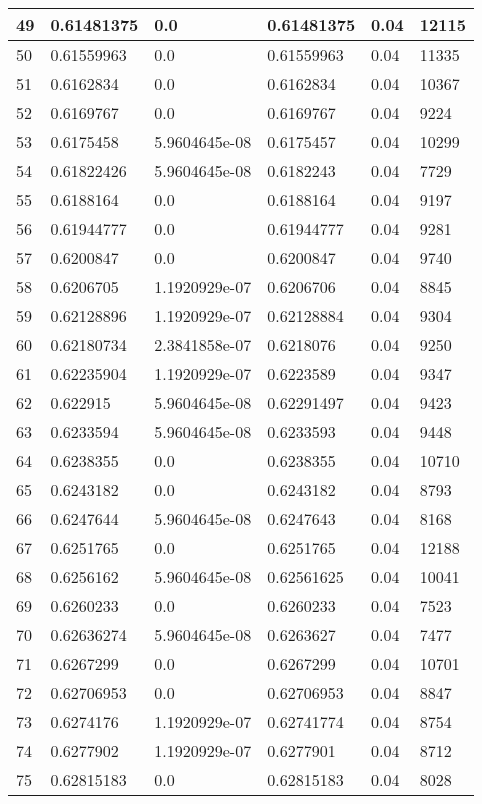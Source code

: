 \begin{longtable}{|l|l|l|l|l|l|}
49 & 0.61481375 & 0.0 & 0.61481375 & 0.04 & 12115 \\ \hline 
50 & 0.61559963 & 0.0 & 0.61559963 & 0.04 & 11335 \\ \hline 
51 & 0.6162834 & 0.0 & 0.6162834 & 0.04 & 10367 \\ \hline 
52 & 0.6169767 & 0.0 & 0.6169767 & 0.04 & 9224 \\ \hline 
53 & 0.6175458 & 5.9604645e-08 & 0.6175457 & 0.04 & 10299 \\ \hline 
54 & 0.61822426 & 5.9604645e-08 & 0.6182243 & 0.04 & 7729 \\ \hline 
55 & 0.6188164 & 0.0 & 0.6188164 & 0.04 & 9197 \\ \hline 
56 & 0.61944777 & 0.0 & 0.61944777 & 0.04 & 9281 \\ \hline 
57 & 0.6200847 & 0.0 & 0.6200847 & 0.04 & 9740 \\ \hline 
58 & 0.6206705 & 1.1920929e-07 & 0.6206706 & 0.04 & 8845 \\ \hline 
59 & 0.62128896 & 1.1920929e-07 & 0.62128884 & 0.04 & 9304 \\ \hline 
60 & 0.62180734 & 2.3841858e-07 & 0.6218076 & 0.04 & 9250 \\ \hline 
61 & 0.62235904 & 1.1920929e-07 & 0.6223589 & 0.04 & 9347 \\ \hline 
62 & 0.622915 & 5.9604645e-08 & 0.62291497 & 0.04 & 9423 \\ \hline 
63 & 0.6233594 & 5.9604645e-08 & 0.6233593 & 0.04 & 9448 \\ \hline 
64 & 0.6238355 & 0.0 & 0.6238355 & 0.04 & 10710 \\ \hline 
65 & 0.6243182 & 0.0 & 0.6243182 & 0.04 & 8793 \\ \hline 
66 & 0.6247644 & 5.9604645e-08 & 0.6247643 & 0.04 & 8168 \\ \hline 
67 & 0.6251765 & 0.0 & 0.6251765 & 0.04 & 12188 \\ \hline 
68 & 0.6256162 & 5.9604645e-08 & 0.62561625 & 0.04 & 10041 \\ \hline 
69 & 0.6260233 & 0.0 & 0.6260233 & 0.04 & 7523 \\ \hline 
70 & 0.62636274 & 5.9604645e-08 & 0.6263627 & 0.04 & 7477 \\ \hline 
71 & 0.6267299 & 0.0 & 0.6267299 & 0.04 & 10701 \\ \hline 
72 & 0.62706953 & 0.0 & 0.62706953 & 0.04 & 8847 \\ \hline 
73 & 0.6274176 & 1.1920929e-07 & 0.62741774 & 0.04 & 8754 \\ \hline 
74 & 0.6277902 & 1.1920929e-07 & 0.6277901 & 0.04 & 8712 \\ \hline 
75 & 0.62815183 & 0.0 & 0.62815183 & 0.04 & 8028 \\ \hline 
\end{longtable}